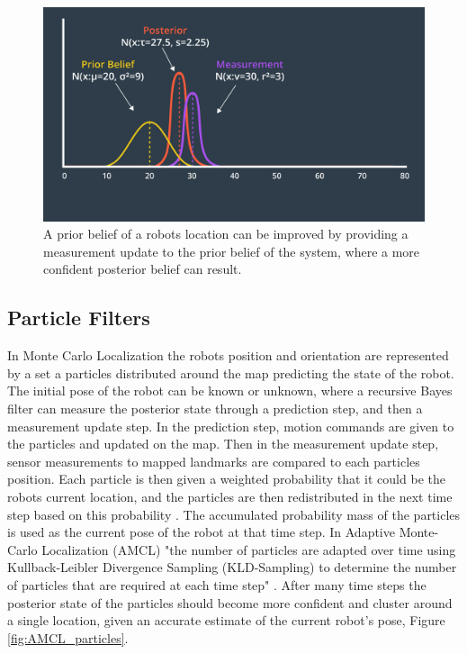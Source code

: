 \documentclass[10pt,journal,compsoc]{IEEEtran}
\begin{document}
\begin{figure}[thpb]
      \centering
      \includegraphics[width=\linewidth]{../img/Bayes_Theorem.png}
      \caption{A prior belief of a robots location can be improved by providing a measurement update to the prior belief of the system, where a more confident posterior belief can result.}
      \label{fig:posteriorState}
\end{figure}


\subsection{Particle Filters}

In Monte Carlo Localization the robots position and orientation are represented by a set a particles distributed around the map predicting the state of the robot. The initial pose of the robot can be known or unknown, where a recursive Bayes filter can measure the posterior state through a prediction step, and then a measurement update step. In the prediction step, motion commands are given to the particles and updated on the map. Then in the measurement update step, sensor measurements to mapped landmarks are compared to each particles position. Each particle is then given a weighted probability that it could be the robots current location, and the particles are then redistributed in the next time step based on this probability \cite{PEEL2018244}. The accumulated probability mass of the particles is used as the current pose of the robot at that time step. In Adaptive Monte-Carlo Localization (AMCL) "the number of particles are adapted over time using Kullback-Leibler Divergence Sampling (KLD-Sampling) to determine the number of particles that are required at each time step" \cite{PEEL2018244}. After many time steps the posterior state of the particles should become more confident and cluster around a single location, given an accurate estimate of the current robot's pose, Figure \ref{fig:AMCL_particles}.
\end{document}
